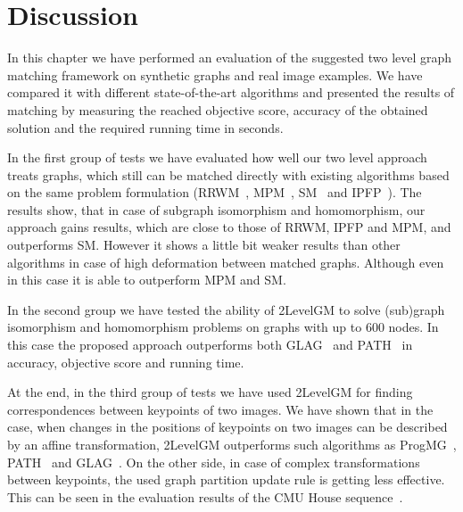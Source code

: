 \section{Discussion}

In this chapter we have performed an evaluation of the suggested two level graph matching framework on synthetic graphs and real image examples. We have compared it with different state-of-the-art algorithms and presented the results of matching by measuring the reached objective score, accuracy of the obtained solution and the required running time in seconds.

In the first group of tests we have evaluated how well our two level approach treats graphs, which still can be matched directly with existing algorithms based on the same problem formulation (RRWM~\cite{Cho2010_RRWM}, MPM~\cite{Cho2014_Haystack}, SM~\cite{Leordeanu2005_SM} and IPFP~\cite{Leordeanu2009_IPFP}). The results show, that in case of subgraph isomorphism and homomorphism, our approach gains results, which are close to those of RRWM, IPFP and MPM, and outperforms SM. However it shows a little bit weaker results than other algorithms in case of high deformation between matched graphs. Although even in this case it is able to outperform MPM and SM.

In the second group we have tested the ability of 2LevelGM to solve (sub)graph isomorphism and homomorphism problems on graphs with up to $600$ nodes. In this case the proposed approach outperforms both GLAG~\cite{Fiori2013_GLAG} and PATH~\cite{Zazlavskiy2008_PATH} in accuracy, objective score and running time.

At the end, in the third group of tests we have used 2LevelGM for finding correspondences between keypoints of two images. We have shown that in the case, when changes in the positions of keypoints on two images can be described by an affine transformation, 2LevelGM outperforms such algorithms as ProgMG~\cite{Cho2012_ProgressiveGM}, PATH~\cite{Zazlavskiy2008_PATH} and GLAG~\cite{Fiori2013_GLAG}. On the other side, in case of complex transformations between keypoints, the used graph partition update rule is getting less effective. This can be seen in the evaluation results of the CMU House sequence~\cite{CMUHouse}.%
